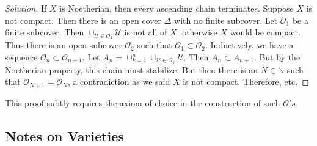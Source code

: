 \documentclass[crop=false,class=article,oneside]{standalone}
\begin{document}
            \begin{proof}[Solution]
                If $X$ is Noetherian, then every ascending
                chain terminates. Suppose $X$ is not compact.
                Then there is an open cover $\Delta$ with no
                finite subcover. Let $\mathcal{O}_1$ be a finite
                subcover. Then
                $\cup_{\mathcal{U}\in \mathcal{O}_1}\mathcal{U}$
                is not all of $X$, otherwise $X$ would be compact.
                Thus there is an open subcover $\mathcal{O}_2$
                such that $\mathcal{O}_1 \subset \mathcal{O}_2$.
                Inductively, we have a sequence
                $\mathcal{O}_n\subset \mathcal{O}_{n+1}$. Let
                $A_{n}=\cup_{k=1}^{n}\cup_{\mathcal{U}\in \mathcal{O}_k}\mathcal{U}$.
                Then $A_{n}\subset A_{n+1}$.
                But by the Noetherian property,
                this chain must stabilize.
                But then there is an $N\in \mathbb{N}$
                such that $\mathcal{O}_{N+1}=\mathcal{O}_N$,
                a contradiction as we said $X$ is not compact.
                Therefore, etc.
            \end{proof}
            \begin{remark}
                This proof subtly requires the axiom of
                choice in the construction of such
                $\mathcal{O}'s$.
            \end{remark}
    \subsection{Notes on Varieties}
\end{document}
